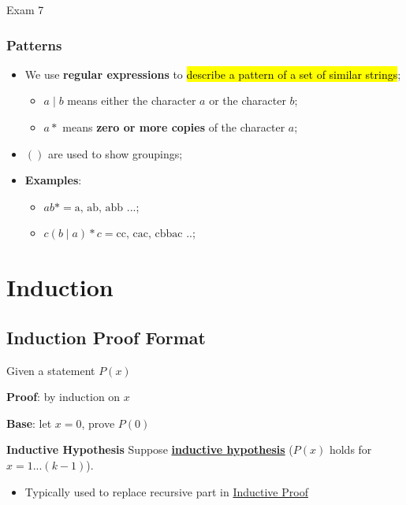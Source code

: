 \documentclass{note}
\begin{document}
\begin{note}{Exam 7}
	\subsubsection{Patterns}

	\begin{itemize}
	    \item We use \textbf{regular expressions} to \hl{describe a pattern of a set of similar strings};
		\begin{itemize}
		    \item $ a \mid b $ means either the character $ a $ or the character $ b $;
		    \item $ a* $ means \textbf{zero or more copies} of the character $ a $;
		\end{itemize}
	    \item $ () $ are used to show groupings;
	    \item \textbf{Examples}:
		\begin{itemize}
		    \item $ ab* = \text{a, ab, abb ...} $;
		    \item $ c \left( b \mid a \right) * c = \text{cc, cac, cbbac ..} $;
		\end{itemize}
	\end{itemize}

	\section{Induction}

	\subsection{Induction Proof Format}

	\begin{center}
		Given a statement $ P(x) $
	\end{center}

	\begin{tcolorbox}

		\textbf{Proof}: by induction on $ x $

		\textbf{Base}: let $ x = 0 $, prove $ P(0) $

		\textbf{Inductive Hypothesis} Suppose \ul{\textbf{inductive hypothesis}} ($ P(x) $ holds for
		$ x = 1...(k - 1) $).
		\begin{itemize}
			\item Typically used to replace recursive part in \ul{Inductive Proof}
		\end{itemize}


\end{tcolorbox}
\end{note}
\end{document}
